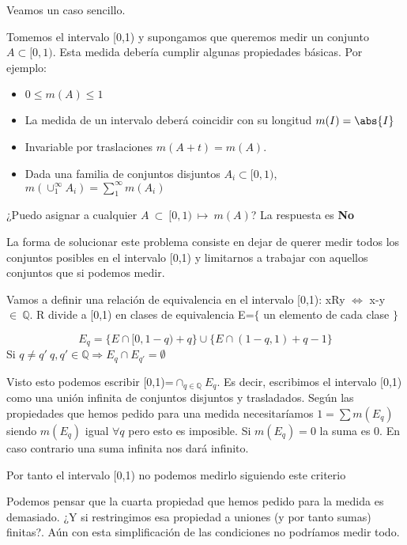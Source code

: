 \documentclass{apuntes}
\begin{document}
Veamos un caso sencillo. 
\begin{example}
Tomemos el intervalo [0,1) y supongamos que queremos medir un conjunto $A\subset [0,1)$. Esta medida debería cumplir algunas propiedades básicas. Por ejemplo:
\begin{itemize}
\item $0\leq m(A) \leq 1$
\item La medida de un intervalo deberá coincidir con su longitud $m(I)=\abs{I}$
\item Invariable por traslaciones $m(A+t) = m(A)$.
\item Dada una familia de conjuntos disjuntos $A_i\subset [0,1)$, $m(\cup_{1}^{\infty} A_i) = \sum_{1}^{\infty}m(A_i)$
\end{itemize}

¿Puedo asignar a cualquier $A~\subset~[0,1)~\mapsto~m(A)$? La respuesta es \textbf{No}

La forma de solucionar este problema consiste en dejar de querer medir todos los conjuntos posibles en el intervalo [0,1) y limitarnos a trabajar con aquellos conjuntos que si podemos medir.

Vamos a definir una relación de equivalencia en el intervalo [0,1): xRy $\Leftrightarrow$ x-y~$\in~\mathbb{Q}$. R divide a [0,1) en clases de equivalencia E=$\lbrace$ un elemento de cada clase $\rbrace$

\[E_q = \lbrace E\cap [0, 1-q) +q \rbrace \cup \lbrace E\cap (1-q, 1) + q - 1\rbrace\]
Si $q \neq q' \ q,q'\in \mathbb{Q} \Rightarrow E_q\cap E_{q'} = \emptyset$

Visto esto podemos escribir [0,1)=$\cap_{q\in \mathbb{Q}}E_q$. Es decir, escribimos el intervalo [0,1) como una unión infinita de conjuntos disjuntos y trasladados. Según las propiedades que hemos pedido para una medida necesitaríamos $1 = \sum m(E_q)$ siendo $m(E_q)$ igual $\forall q$  pero esto es imposible. Si $m(E_q) = 0$ la suma es 0. En caso contrario una suma infinita nos dará infinito.

Por tanto el intervalo [0,1) no podemos medirlo siguiendo este criterio

\end{example}

Podemos pensar que la cuarta propiedad que hemos pedido para la medida es demasiado. ¿Y si restringimos esa propiedad a uniones (y por tanto sumas) finitas?. Aún con esta simplificación de las condiciones no podríamos medir todo.
\end{document}
